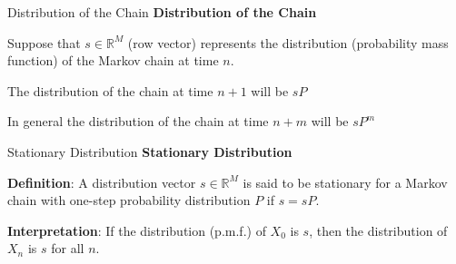 \documentclass[8pt]{beamer}
\begin{document}
\begin{frame}{Distribution of the Chain}
\textbf{Distribution of the Chain}

\vspace{3mm}

Suppose that $s \in \mathbb{R}^M$ (row vector) represents the distribution (probability mass function) of the Markov chain at time $n$.\\
\vspace{3mm}

The distribution of the chain at time $n+1$ will be $sP$

\vspace{3mm}

In general the distribution of the chain at time $n+m$ will be $sP^m$
\end{frame}

\begin{frame}{Stationary Distribution}
\textbf{Stationary Distribution}

\vspace{3mm}

\textbf{Definition}:  A distribution vector $s \in \mathbb{R}^M$ is said to be stationary for a Markov chain with one-step probability distribution $P$ if $s=sP$.

\vspace{3mm}

\textbf{Interpretation}: If the distribution (p.m.f.) of $X_0$ is  $s$, then the distribution of $X_n$ is $s$ for all $n$.
\end{frame}
\end{document}
